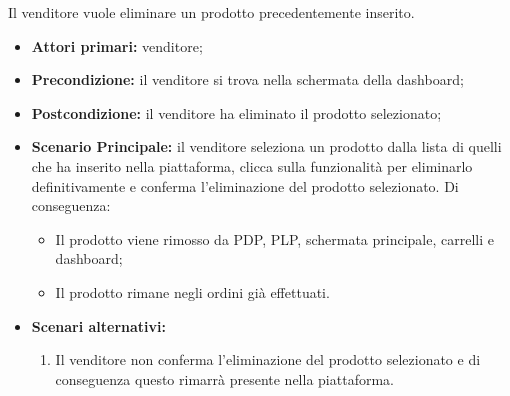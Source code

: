 Il venditore vuole eliminare un prodotto precedentemente inserito.
\begin{itemize}
    \item \textbf{Attori primari:} venditore;
    \item \textbf{Precondizione:} il venditore si trova nella schermata della dashboard;
    \item \textbf{Postcondizione:} il venditore ha eliminato il prodotto selezionato;
    \item \textbf{Scenario Principale:} il venditore seleziona un prodotto dalla lista di quelli che ha inserito nella piattaforma, clicca sulla funzionalità per eliminarlo definitivamente e conferma l'eliminazione del prodotto selezionato. Di conseguenza:
    \begin{itemize}
    	\item Il prodotto viene rimosso da PDP, PLP, schermata principale, carrelli e dashboard;
    	\item Il prodotto rimane negli ordini già effettuati.
    \end{itemize}
	\item \textbf{Scenari alternativi:}
	\begin{enumerate}[label=\lett]
		\item Il venditore non conferma l'eliminazione del prodotto selezionato e di conseguenza questo rimarrà presente nella piattaforma.
	\end{enumerate}
\end{itemize}


